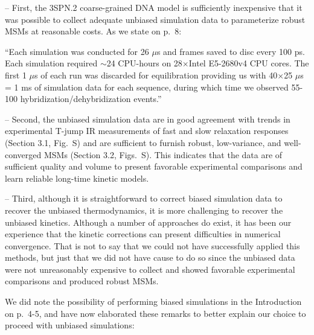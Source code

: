 \documentclass[11pt,a4paper]{letter} %
\newcommand*{\rood}[1]{{\color{red}{#1}}}
\begin{document}
-- First, the 3SPN.2 coarse-grained DNA model is sufficiently inexpensive that it was possible to collect adequate unbiased simulation data to parameterize robust MSMs at reasonable costs. As we state on p.~8: 

``Each simulation was conducted for 26 $\mu$s and frames saved to disc every 100 ps. Each simulation required $\sim$24 CPU-hours on 28$\times$Intel E5-2680v4 CPU cores. The first 1 $\mu$s of each run was discarded for equilibration providing us with 40$\times$25 $\mu$s = 1 ms of simulation data for each sequence, during which time we observed 55-100 hybridization/dehybridization events.''

-- Second, the unbiased simulation data are in good agreement with trends in experimental T-jump IR measurements of fast and slow relaxation responses (Section 3.1, Fig.~S\rood{4}) and are sufficient to furnish robust, low-variance, and well-converged MSMs (Section 3.2, Figs.~S\rood{1-3}). This indicates that the data are of sufficient quality and volume to present favorable experimental comparisons and learn reliable long-time kinetic models.

-- Third, although it is straightforward to correct biased simulation data to recover the unbiased thermodynamics, it is more challenging to recover the unbiased kinetics. Although a number of approaches do exist, it has been our experience that the kinetic corrections can present difficulties in numerical convergence. That is not to say that we could not have successfully applied this methods, but just that we did not have cause to do so since the unbiased data were not unreasonably expensive to collect and showed favorable experimental comparisons and produced robust MSMs.

We did note the possibility of performing biased simulations in the Introduction on p.~4-5, and have now elaborated these remarks to better explain our choice to proceed with unbiased simulations:
\end{document}
